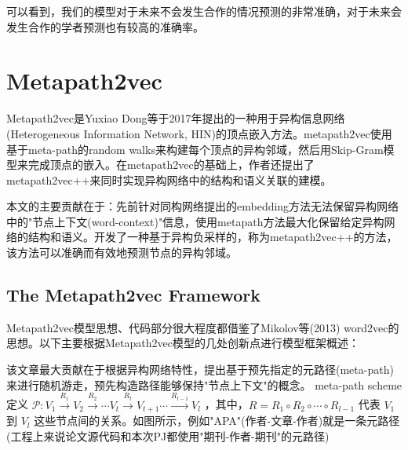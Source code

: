 \documentclass{bmvc2k}
\begin{document}
可以看到，我们的模型对于未来不会发生合作的情况预测的非常准确，对于未来会发生合作的学者预测也有较高的准确率。



\section{Metapath2vec}
Metapath2vec是Yuxiao Dong等\cite{10.1145/3097983.3098036}于2017年提出的一种用于异构信息网络(Heterogeneous Information Network, HIN)的顶点嵌入方法。metapath2vec使用基于meta-path的random walks来构建每个顶点的异构邻域，然后用Skip-Gram模型来完成顶点的嵌入。在metapath2vec的基础上，作者还提出了metapath2vec++来同时实现异构网络中的结构和语义关联的建模。

本文的主要贡献在于：先前针对同构网络提出的embedding方法无法保留异构网络中的"节点上下文(word-context)"信息，使用metapath方法最大化保留给定异构网络的结构和语义。开发了一种基于异构负采样的，称为metapath2vec++的方法，该方法可以准确而有效地预测节点的异构邻域。

\subsection{The Metapath2vec Framework}
Metapath2vec模型思想、代码部分很大程度都借鉴了Mikolov等(2013) word2vec\cite{10.5555/2999792.2999959}的思想。以下主要根据Metapath2vec模型的几处创新点进行模型框架概述：

该文章最大贡献在于根据异构网络特性，提出基于预先指定的元路径(meta-path)来进行随机游走，预先构造路径能够保持"节点上下文"的概念。 meta-path scheme  定义
$\mathcal{P}: V_{1} \stackrel{R_{1}}{\longrightarrow} V_{2} \stackrel{R_{2}}{\longrightarrow} \cdots V_{t} \stackrel{R_{t}}{\longrightarrow} V_{t+1} \cdots \stackrel{R_{l-1}}{\longrightarrow} V_{l}$ ，其中，$R=R_{1} \circ R_{2} \circ \cdots \circ R_{l-1}$ 代表 $V_{1}$ 到 $V_{l}$ 这些节点间的关系。如图所示，例如"APA"(作者-文章-作者)就是一条元路径(工程上来说论文源代码和本次PJ都使用"期刊-作者-期刊"的元路径)
\end{document}
